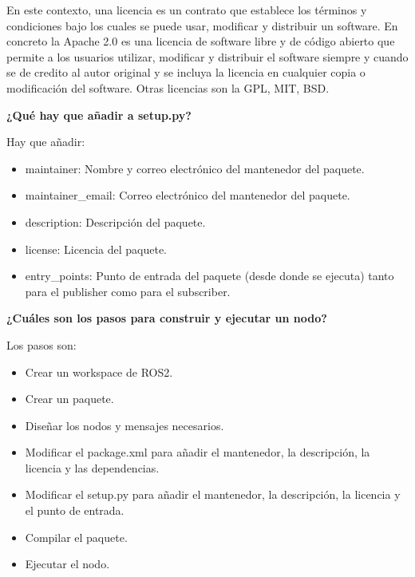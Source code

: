 \documentclass[a4paper,12pt]{article}
\begin{document}
{\vspace{0.5cm}

En este contexto, una licencia es un contrato que establece los términos y condiciones bajo los cuales se puede usar, 
modificar y distribuir un software. En concreto la Apache 2.0 es una licencia de software libre y de código abierto 
que permite a los usuarios utilizar, modificar y distribuir el software siempre y cuando se de credito al autor 
original y se incluya la licencia en cualquier copia o modificación del software. Otras licencias son la GPL, MIT, BSD.

\vspace{1cm}


\textbf{¿Qué hay que añadir a setup.py?}


\vspace{1cm}

Hay que añadir:

\vspace{0.5cm}

\begin{itemize}
    \item maintainer: Nombre y correo electrónico del mantenedor del paquete.
    \item maintainer\_email: Correo electrónico del mantenedor del paquete.
    \item description: Descripción del paquete.
    \item license: Licencia del paquete.
    \item entry\_points: Punto de entrada del paquete (desde donde se ejecuta) tanto para el publisher como para el subscriber.
\end{itemize}

\vspace{1cm}


\textbf{¿Cuáles son los pasos para construir y ejecutar un nodo?}


\vspace{1cm}

Los pasos son:

\vspace{0.5cm}

\begin{itemize}
    \item Crear un workspace de ROS2.
    \item Crear un paquete.
    \item Diseñar los nodos y mensajes necesarios.
    \item Modificar el package.xml para añadir el mantenedor,  la descripción, la licencia y las dependencias.
    \item Modificar el setup.py para añadir el mantenedor, la descripción, la licencia y el punto de entrada.
    \item Compilar el paquete.
    \item Ejecutar el nodo.
\end{itemize}

}
\end{document}
